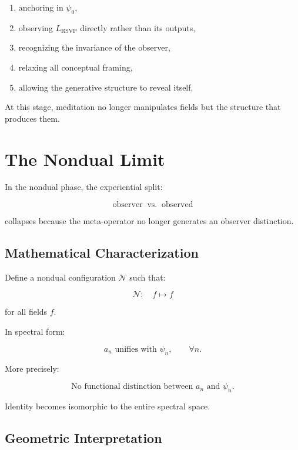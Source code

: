 \documentclass[12pt]{article}
\begin{document}
\begin{enumerate}
    \item anchoring in $\psi_0$,  
    \item observing $L_{\text{RSVP}}$ directly rather than its outputs,  
    \item recognizing the invariance of the observer,  
    \item relaxing all conceptual framing,  
    \item allowing the generative structure to reveal itself.  
\end{enumerate}

At this stage, meditation no longer manipulates fields but the structure that produces them.

\newpage


\chapter{The Nondual Limit}

In the nondual phase, the experiential split:

\[
\text{observer} \;\; \text{vs.} \;\; \text{observed}
\]

collapses because the meta-operator no longer generates an observer distinction.

\section{Mathematical Characterization}

Define a nondual configuration $\mathcal{N}$ such that:

\[
\mathcal{N}: \quad f \mapsto f
\]

for all fields $f$.

In spectral form:

\[
a_n \text{ unifies with } \psi_n,
\qquad
\forall n.
\]

More precisely:

\[
\text{No functional distinction between } a_n \text{ and } \psi_n.
\]

Identity becomes isomorphic to the entire spectral space.

\section{Geometric Interpretation}
\end{document}
